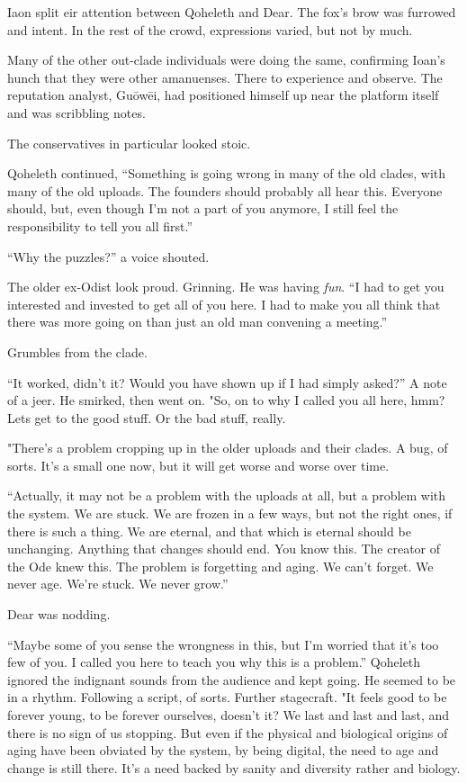 Iaon split eir attention between Qoheleth and Dear. The fox's brow was furrowed and intent. In the rest of the crowd, expressions varied, but not by much.

Many of the other out-clade individuals were doing the same, confirming Ioan's hunch that they were other amanuenses. There to experience and observe. The reputation analyst, Guōwēi, had positioned himself up near the platform itself and was scribbling notes.

The conservatives in particular looked stoic.

Qoheleth continued, ``Something is going wrong in many of the old clades, with many of the old uploads. The founders should probably all hear this. Everyone should, but, even though I'm not a part of you anymore, I still feel the responsibility to tell you all first.''

``Why the puzzles?'' a voice shouted.

The older ex-Odist look proud. Grinning. He was having \emph{fun}. ``I had to get you interested and invested to get all of you here. I had to make you all think that there was more going on than just an old man convening a meeting.''

Grumbles from the clade.

``It worked, didn't it? Would you have shown up if I had simply asked?'' A note of a jeer. He smirked, then went on. "So, on to why I called you all here, hmm? Lets get to the good stuff. Or the bad stuff, really.

"There's a problem cropping up in the older uploads and their clades. A bug, of sorts. It's a small one now, but it will get worse and worse over time.

``Actually, it may not be a problem with the uploads at all, but a problem with the system. We are stuck. We are frozen in a few ways, but not the right ones, if there is such a thing. We are eternal, and that which is eternal should be unchanging. Anything that changes should end. You know this. The creator of the Ode knew this. The problem is forgetting and aging. We can't forget. We never age. We're stuck. We never grow.''

Dear was nodding.

``Maybe some of you sense the wrongness in this, but I'm worried that it's too few of you. I called you here to teach you why this is a problem.'' Qoheleth ignored the indignant sounds from the audience and kept going. He seemed to be in a rhythm. Following a script, of sorts. Further stagecraft. "It feels good to be forever young, to be forever ourselves, doesn't it? We last and last and last, and there is no sign of us stopping. But even if the physical and biological origins of aging have been obviated by the system, by being digital, the need to age and change is still there. It's a need backed by sanity and diversity rather and biology.

